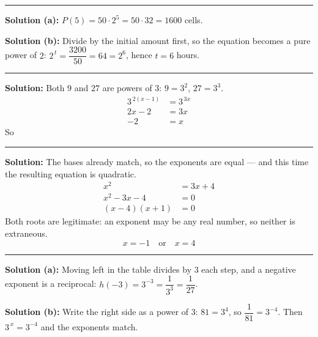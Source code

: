 \documentclass[12pt]{article}
\begin{document}
\vspace{0.15cm}\noindent\rule{\linewidth}{0.2pt}


\textbf{Solution (a):} $P(5) = 50 \cdot 2^{5} = 50 \cdot 32 = 1600$ cells. 

\textbf{Solution (b):} Divide by the initial amount first, so the equation becomes a pure power of $2$: $2^{\,t} = \dfrac{3200}{50} = 64 = 2^{6}$, hence $t = 6$ hours. 

\vspace{0.15cm}\noindent\rule{\linewidth}{0.2pt}


\textbf{Solution:} Both $9$ and $27$ are powers of $3$: $9 = 3^{2}$, $27 = 3^{3}$.
\begin{align*}
  3^{\,2(x-1)} &= 3^{\,3x} \\
  2x - 2 &= 3x \\
  -2 &= x
\end{align*}
So 

\vspace{0.15cm}\noindent\rule{\linewidth}{0.2pt}


\textbf{Solution:} The bases already match, so the exponents are equal --- and this time the resulting equation is quadratic.
\begin{align*}
  x^{2} &= 3x + 4 \\
  x^{2} - 3x - 4 &= 0 \\
  (x - 4)(x + 1) &= 0
\end{align*}
Both roots are legitimate: an exponent may be any real number, so neither is extraneous.
\[ \boxed{x = -1 \quad \text{or} \quad x = 4} \]

\vspace{0.15cm}\noindent\rule{\linewidth}{0.2pt}


\textbf{Solution (a):} Moving left in the table divides by $3$ each step, and a negative exponent is a reciprocal: $h(-3) = 3^{-3} = \dfrac{1}{3^{3}} = \dfrac{1}{27}$. 

\textbf{Solution (b):} Write the right side as a power of $3$: $81 = 3^{4}$, so $\dfrac{1}{81} = 3^{-4}$. Then $3^{\,x} = 3^{-4}$ and the exponents match. 
\end{document}
